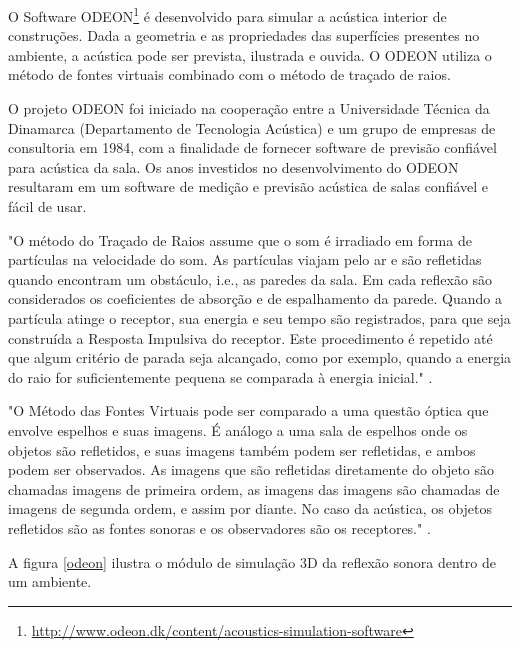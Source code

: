 O Software ODEON\footnote{\url{http://www.odeon.dk/content/acoustics-simulation-software}} é desenvolvido para simular a acústica interior de construções. Dada a geometria e as propriedades das superfícies presentes no ambiente, a acústica pode ser prevista, ilustrada e ouvida. O ODEON utiliza o método de fontes virtuais combinado com o método de traçado de raios.

O projeto ODEON foi iniciado na cooperação entre a Universidade Técnica da Dinamarca (Departamento de Tecnologia Acústica) e um grupo de empresas de consultoria em 1984, com a finalidade de fornecer software de previsão confiável para acústica da sala. Os anos investidos no desenvolvimento do ODEON resultaram em um software de medição e previsão acústica de salas confiável e fácil de usar.

\begin{citacao}
\begin{normalsize}
"O método do Traçado de Raios assume que o som é irradiado em forma de partículas na velocidade
do som. As partículas viajam pelo ar e são refletidas quando encontram um obstáculo, i.e., as
paredes da sala. Em cada reflexão são considerados os coeficientes de absorção e de espalhamento
da parede. Quando a partícula atinge o receptor, sua energia e seu tempo são registrados, para que
seja construída a Resposta Impulsiva do receptor. Este procedimento é repetido até que algum
critério de parada seja alcançado, como por exemplo, quando a energia do raio for suficientemente
pequena se comparada à energia inicial." \cite{fabiana}.
\end{normalsize}
\end{citacao}

\begin{citacao}
\begin{normalsize}
"O Método das Fontes Virtuais pode ser comparado a uma questão óptica que envolve espelhos e suas imagens. É análogo a uma sala de espelhos onde os objetos são refletidos, e suas imagens também podem ser refletidas, e ambos podem ser observados. As imagens que são refletidas diretamente do objeto são chamadas imagens de primeira ordem, as imagens das imagens são chamadas de imagens de segunda ordem, e assim por diante. No caso da acústica, os objetos refletidos são as fontes sonoras e os observadores são os receptores." \cite{fabiana}.
\end{normalsize}
\end{citacao}

A figura \ref{odeon} ilustra o módulo de simulação 3D da reflexão sonora dentro de um ambiente.

